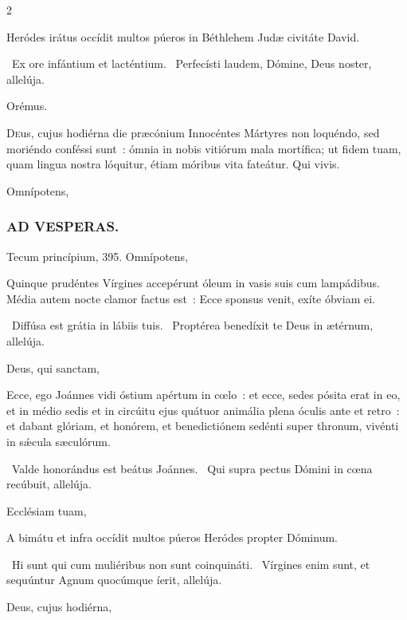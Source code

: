 \documentclass[9pt,twoside]{extarticle}
\begin{document}
\begin{multicols}{2}
\begin{tightlist}{}
\item {} Heródes irátus occídit multos púeros in Béthlehem Judæ civitáte David.
\item {}~Ex ore infántium et lacténtium. ~Perfecísti laudem, Dómine, Deus noster, allelúja.
\item Orémus. \hfill {}
\end{tightlist}
\lettrine{D}eus, cujus hodiérna die præcónium Innocéntes Mártyres non loquéndo, sed moriéndo conféssi sunt~: ómnia in nobis vitiórum mala mortífica; ut fidem tuam, quam lingua nostra lóquitur, étiam móribus vita fateátur. Qui vivis.


\begin{tightlist}{}
\item {} Omnípotens, 
\end{tightlist}


\subsubsection*{\center \textsc{AD VESPERAS.}}
\begin{tightlist}{}
\item {} Tecum princípium,  395.  Omnípotens, 
\item {} Quinque prudéntes Vírgines accepérunt óleum in vasis suis cum lampádibus. Média autem nocte clamor factus est~: Ecce sponsus venit, exíte óbviam ei.
\item {}~Diffúsa est grátia in lábiis tuis. ~Proptérea benedíxit te Deus in ætérnum, allelúja.
\item {} Deus, qui sanctam, 
\item {} Ecce, ego Joánnes vidi óstium apértum in cœlo~: et ecce, sedes pósita erat in eo, et in médio sedis et in circúitu ejus quátuor animália plena óculis ante et retro~: et dabant glóriam, et honórem, et benedictiónem sedénti super thronum, vivénti in sǽcula sæculórum.
\item {}~Valde honorándus est beátus Joánnes. ~Qui supra pectus Dómini in cœna recúbuit, allelúja.
\item {} Ecclésiam tuam, 
\item {} A bimátu et infra occídit multos púeros Heródes propter Dóminum.
\item {}~Hi sunt qui cum muliéribus non sunt coinquináti. ~Vírgines enim sunt, et sequúntur Agnum quocúmque íerit, allelúja.
\item {} Deus, cujus hodiérna, 
\end{tightlist}


\end{multicols}
\end{document}
